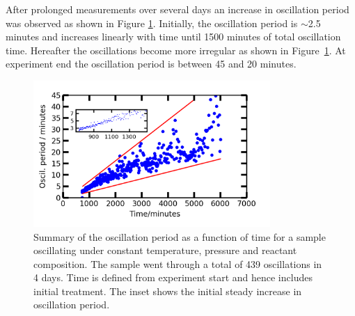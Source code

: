 \documentclass[8.5pt,twoside,twocolumn]{article}
\begin{document}
After prolonged measurements over several days an increase in oscillation period was observed as shown in Figure \ref{fgr:long_measurement}. Initially, the oscillation period is $\sim$2.5 minutes and increases linearly with time until 1500 minutes of total oscillation time. Hereafter the oscillations become more irregular as shown in Figure~\ref{fgr:long_measurement}. At experiment end the oscillation period is between 45 and 20 minutes.
\begin{figure}[h]
\centering
  \includegraphics[width=9cm]{summary_of_long_measurement.png}
  \caption{Summary of the oscillation period as a function of time for a sample oscillating under constant temperature, pressure and reactant composition. The sample went through a total of 439 oscillations in 4 days. Time is defined from experiment start and hence includes initial treatment. The inset shows the initial steady increase in oscillation period.}
  \label{fgr:long_measurement}
\end{figure}
  
\end{document}
